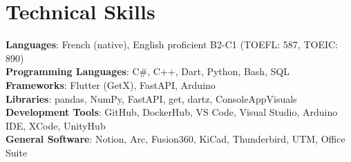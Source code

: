 \documentclass[letterpaper,11pt]{article}
\begin{document}
\section{Technical Skills}
 \begin{itemize}[leftmargin=0.15in, label={}]
    \small{\item{
     \textbf{Languages}{: French (native), English proficient B2-C1 (TOEFL: 587, TOEIC: 890)} \\
     \textbf{Programming Languages}{: C\#, C++, Dart, Python, Bash, SQL} \\
     \textbf{Frameworks}{: Flutter (GetX), FastAPI, Arduino} \\
     \textbf{Libraries}{: pandas, NumPy, FastAPI, get, dartz, ConsoleAppVisuals} \\
     \textbf{Development Tools}{: GitHub, DockerHub, VS Code, Visual Studio, Arduino IDE, XCode, UnityHub} \\
     \textbf{General Software}{: Notion, Arc, Fusion360, KiCad, Thunderbird, UTM, Office Suite}
    }}
 \end{itemize}
\end{document}
